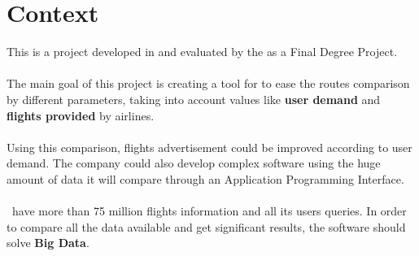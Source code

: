 
\chapter{Context}

\label{chapter01}

This is a project developed in \textit{\company} and evaluated by the \textit{\univname} as a Final Degree Project.
\\\\
The main goal of this project is creating a tool for \textit{\company} to ease the routes comparison by different parameters, taking into account values like \textbf{user demand} and \textbf{flights provided} by airlines.
\\\\
Using this comparison, flights advertisement could be improved according to user demand. The company could also develop complex software using the huge amount of data it will compare through an Application Programming Interface.
\\\\
\company\ have more than 75 million flights information and all its users queries. In order to compare all the data available and get significant results, the software should solve  \textbf{Big Data}.


\section{\company}

